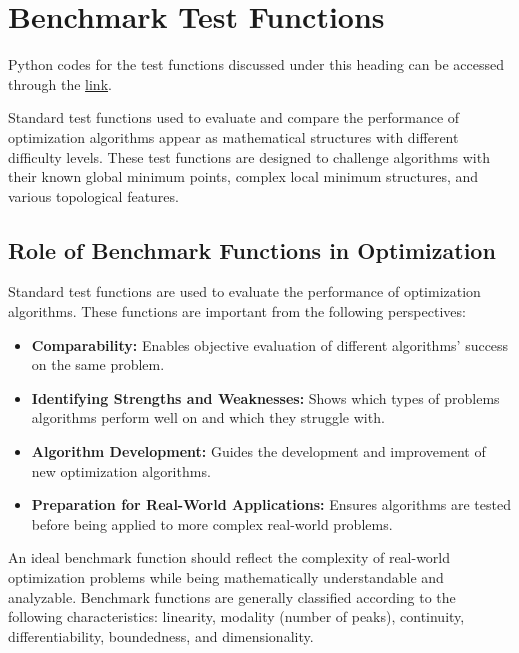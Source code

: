 \section{Benchmark Test Functions}
Python codes for the test functions discussed under this heading can be accessed through the \href{https://github.com/btayfur/structural-optimization/blob/main/Code/Sources/OptimizationBenchmarks}{link}. 

Standard test functions used to evaluate and compare the performance of optimization algorithms appear as mathematical structures with different difficulty levels. These test functions are designed to challenge algorithms with their known global minimum points, complex local minimum structures, and various topological features.

\subsection{Role of Benchmark Functions in Optimization}

Standard test functions are used to evaluate the performance of optimization algorithms. These functions are important from the following perspectives:

\begin{itemize}
    \item \textbf{Comparability:} Enables objective evaluation of different algorithms' success on the same problem.
    \item \textbf{Identifying Strengths and Weaknesses:} Shows which types of problems algorithms perform well on and which they struggle with.
    \item \textbf{Algorithm Development:} Guides the development and improvement of new optimization algorithms.
    \item \textbf{Preparation for Real-World Applications:} Ensures algorithms are tested before being applied to more complex real-world problems.
\end{itemize}

An ideal benchmark function should reflect the complexity of real-world optimization problems while being mathematically understandable and analyzable. Benchmark functions are generally classified according to the following characteristics: linearity, modality (number of peaks), continuity, differentiability, boundedness, and dimensionality.

